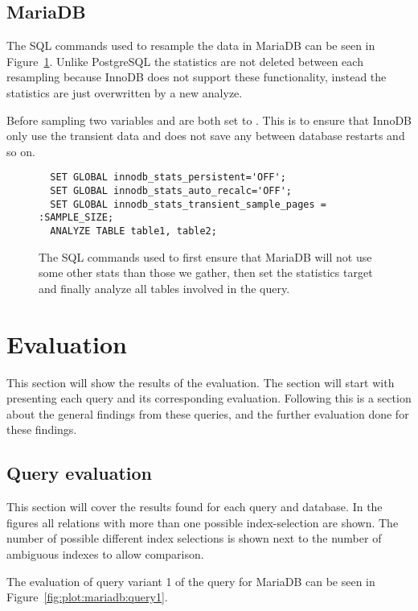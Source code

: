 \subsection{MariaDB}\label{sec:mariadb}
The SQL commands used to resample the data in MariaDB can be seen in
Figure~\ref{fig:sql:resamplemdb}. Unlike PostgreSQL the statistics are not
deleted between each resampling because InnoDB does not support these
functionality, instead the statistics are just overwritten by a new analyze.

Before sampling two variables  and
 are both set to . This is to ensure
that InnoDB only use the transient data and does not save any between database
restarts and so on.

\begin{figure}[ht]
\begin{verbatim}
  SET GLOBAL innodb_stats_persistent='OFF';
  SET GLOBAL innodb_stats_auto_recalc='OFF';
  SET GLOBAL innodb_stats_transient_sample_pages = :SAMPLE_SIZE;
  ANALYZE TABLE table1, table2;
\end{verbatim}
\caption[The SQL commands used to resample in MariaDB.]{The SQL commands used to
first ensure that MariaDB will not use some other stats than those we gather,
then set the statistics target and finally analyze all tables involved in the query.}
\label{fig:sql:resamplemdb}
\end{figure}

\section{Evaluation}
This section will show the results of the evaluation. The section will start
with presenting each query and its corresponding evaluation. Following this is a
section about the general findings from these queries, and the further
evaluation done for these findings.

\subsection{Query evaluation}
This section will cover the results found for each query and database. In the
figures all relations with more than one possible index-selection are shown.
The number of possible different index selections is shown next to the number of
ambiguous indexes to allow comparison.

The evaluation of query variant 1 of the query for MariaDB can be seen in
Figure~\ref{fig:plot:mariadb:query1}.

